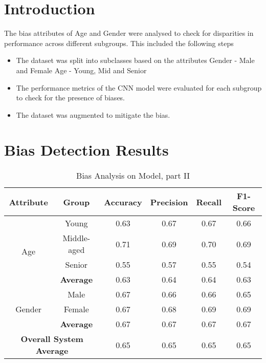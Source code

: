 \section{Introduction}
The bias attributes of Age and Gender were analysed to check for disparities in performance across different subgroups. This included the following steps
\begin{itemize}
    \item The dataset was split into subclasses based on the attributes 
        \subitem Gender - Male and Female
        \subitem Age - Young, Mid and Senior
    \item The performance metrics of the CNN model were evaluated for each subgroup to check for the presence of biases.
    \item The dataset was augmented to mitigate the bias.
\end{itemize}
\section{Bias Detection Results}
\begin{table}[h!]
    \centering
    \begin{tabular}{|c|c|c|c|c|c|}
        \hline
        \textbf{Attribute} & \textbf{Group} & \textbf{Accuracy} & \textbf{Precision} & \textbf{Recall} & \textbf{F1-Score} \\
        \hline
        \multirow{4}{*}{Age} & Young & 0.63 & 0.67 & 0.67 & 0.66 \\
        \cline{2-6}
         & Middle-aged & 0.71 & 0.69 & 0.70 & 0.69 \\
        \cline{2-6}
         & Senior & 0.55 & 0.57 & 0.55 & 0.54 \\
        \cline{2-6}
         & \textbf{Average} & 0.63 & 0.64 & 0.64 & 0.63 \\
        \hline
        \multirow{3}{*}{Gender} & Male & 0.67 & 0.66 & 0.66 & 0.65 \\
        \cline{2-6}
        & Female & 0.67 & 0.68 & 0.69 & 0.69 \\
        \cline{2-6}
        & \textbf{Average} & 0.67 & 0.67 & 0.67 & 0.67 \\
        \hline
        \hline
        \multicolumn{2}{|c|}{\textbf{Overall System Average }} & 0.65 & 0.65 & 0.65 & 0.65 \\
        \hline
    \end{tabular}
    \caption{ Bias Analysis on Model, part II}
    \label{tab:bias-analysis}
\end{table}

